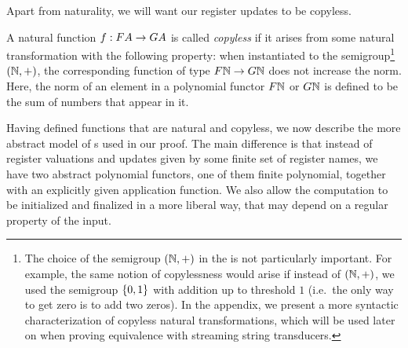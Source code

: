 Apart from naturality, we will want our register updates to be copyless. 

\begin{definition} \label{def:copyless} A natural function $f : \functor A \to \functorg A$ is  called \emph{copyless} if it arises from some natural transformation with the following property:  when instantiated to the semigroup\footnote{The choice of the semigroup $({\mathbb N},+)$ in the  is not particularly important. For example, the same notion of copylessness would arise if instead of $({\mathbb N},+)$, we used the semigroup $\{0,1\}$ with addition up to threshold $1$ (i.e.~the only way to get zero is to add two zeros). In the appendix, we present a more syntactic characterization of copyless natural transformations, which will be used later on when proving equivalence with streaming string transducers. 
    } $({\mathbb N},+)$, the corresponding function of type $\functor \Nat \to \functorg \Nat$ 
    does not increase the norm. Here, the norm of an element in a polynomial functor $\functor \Nat$ or $\functorg \Nat$ is defined to be the sum of numbers that appear in it.
\end{definition}

Having defined functions that are natural and copyless, we now describe the more
abstract model of \sst{}s used in our proof. The main difference is that instead
of register valuations and updates given by some finite set of register names,
we have two abstract polynomial functors, one of them finite polynomial,
together with an explicitly given application function. We also allow the
computation to be initialized and finalized in a more liberal way, that may depend on a
regular property of the input.

